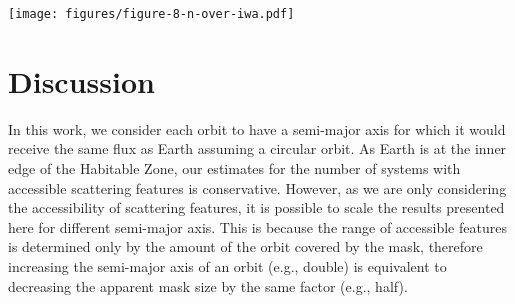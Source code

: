\documentclass[usenatbib]{mnras}
\newcommand{\IWA}{\ensuremath{\mathrm{IWA}}\xspace}
\newcommand{\Decadal}{Astro2020}  %
\begin{document}
\begin{figure*}
    \centering
    \texttt{[image: figures/figure-8-n-over-iwa.pdf]}
    \caption{
        The number of systems for which key optical phenomena (Rayleigh scattering peak, rainbow, ocean glint, glory) would be accessible as functions of the \IWA.
        Each subplot contains three lines showing the number of systems where the start of each the phenomenon is accessible (dashed lines), where the peak is accessible (solid lines), and where the end is accessible (dotted lines).
        For Rayleigh scattering, the line for the start of the feature (at $\alpha=\qty{70}{\degree}$) and the line for the peak (at $\alpha=\qty{110}{\degree}$) coincide, as their respective phase angles are at the same distance from quadrature.
        The $x$-axis at the bottom shows the \IWA of the coronagraph in \unit{mas}, and the $x$-axis at the top shows the same \IWA converted to $\lambda/D$ for $\lambda = \qty{600}{\nano\meter}$ and $D = \qty{6}{\meter}$.
        The $y$-axis on the right indicates the number of systems where all phenomena would be accessible, assuming \qty{24}{\percent} of them have an Earth-like exoplanet in their HZ (as assumed in \Decadal).
    }
    \label{fig:accessible_phase_angles}
\end{figure*}


\vspace{-2mm}
\section{Discussion}
\label{sec:4}

In this work, we consider each orbit to have a semi-major axis for which it would receive the same flux as Earth assuming a circular orbit.
%
As Earth is at the inner edge of the Habitable Zone, our estimates for the number of systems with accessible scattering features is conservative.
%
However, as we are only considering the accessibility of scattering features, it is possible to scale the results presented here for different semi-major axis. 
%
This is because the range of accessible features is determined only by the amount of the orbit covered by the mask, therefore increasing the semi-major axis of an orbit (e.g., double) is equivalent to decreasing the apparent mask size by the same factor (e.g., half).
\end{document}
